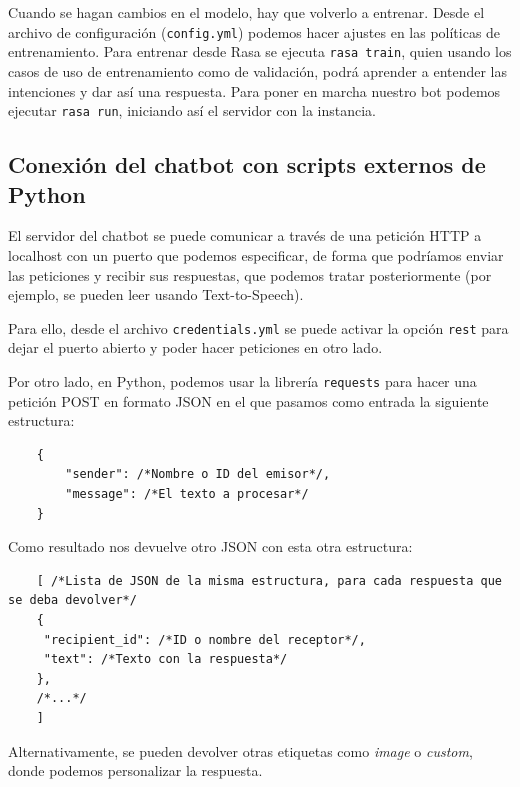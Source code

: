 Cuando se hagan cambios en el modelo, hay que volverlo a entrenar. Desde el archivo de configuración (\texttt{config.yml}) podemos hacer ajustes en las políticas de entrenamiento.
Para entrenar desde Rasa se ejecuta \texttt{rasa train}, quien usando los casos de uso de entrenamiento como de validación, podrá aprender a entender las intenciones y dar así una respuesta.
Para poner en marcha nuestro bot podemos ejecutar \texttt{rasa run}, iniciando así el servidor con la instancia.



\subsection{Conexión del chatbot con scripts externos de Python}
El servidor del chatbot se puede comunicar a través de una petición HTTP a localhost con un puerto que podemos especificar, de forma que podríamos enviar las peticiones y recibir sus respuestas, que podemos tratar posteriormente (por ejemplo, se pueden leer usando Text-to-Speech).

Para ello, desde el archivo \texttt{credentials.yml} se puede activar la opción \texttt{rest} para dejar el puerto abierto y poder hacer peticiones en otro lado.

Por otro lado, en Python, podemos usar la librería \texttt{requests} para hacer una petición POST en formato JSON en el que pasamos como entrada la siguiente estructura:


\begin{lstlisting}
	{
		"sender": /*Nombre o ID del emisor*/,
		"message": /*El texto a procesar*/
	}
\end{lstlisting}

Como resultado nos devuelve otro JSON con esta otra estructura:

\begin{lstlisting}
	[ /*Lista de JSON de la misma estructura, para cada respuesta que se deba devolver*/
	{
	 "recipient_id": /*ID o nombre del receptor*/,
	 "text": /*Texto con la respuesta*/
 	}, 
	/*...*/
	]
\end{lstlisting}

Alternativamente, se pueden devolver otras etiquetas como \textit{image} o \textit{custom}, donde podemos personalizar la respuesta.

